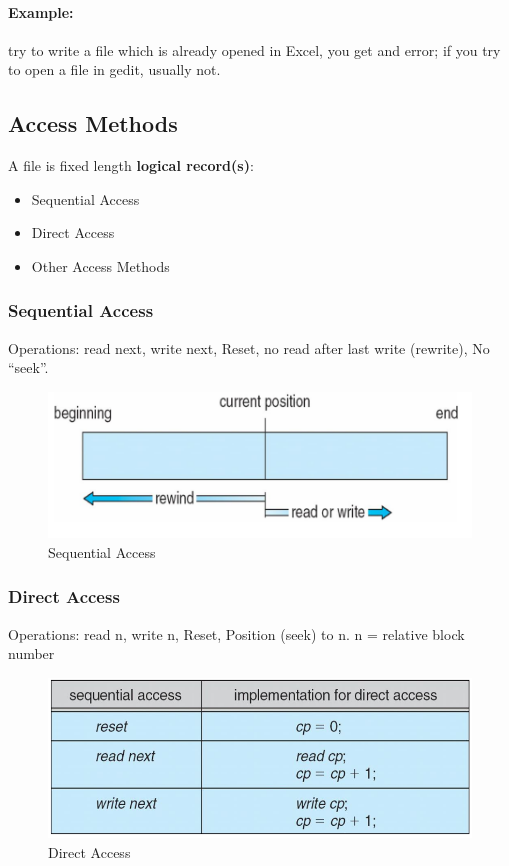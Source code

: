 \paragraph{Example: } try to write a file which is already opened in Excel, you get and error; if you try to open a file in gedit, usually not.

\subsection{Access Methods}

A file is fixed length \textbf{logical record(s)}: 

\begin{itemize}
    \item Sequential Access
    \item Direct Access
    \item Other Access Methods
\end{itemize}

\subsubsection{Sequential Access}
Operations: read next, write next, Reset, no read after last write (rewrite), No “seek”.


\begin{figure}[h!]
    \centering
    \includegraphics[width=0.45\linewidth]{img/andfg.png}
    \caption{Sequential Access}
\end{figure}

\subsubsection{Direct Access}
Operations: read n, write n, Reset, Position (seek) to n. n = relative block number

\begin{figure}[h!]
    \centering
    \includegraphics[width=0.5\linewidth]{img/dbfs.png}
    \caption{Direct Access}
\end{figure}

